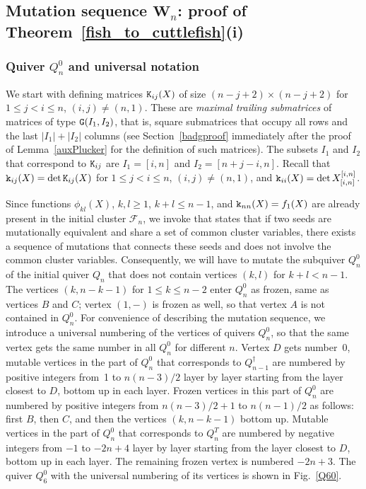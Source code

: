 \documentclass{amsart}
\theoremstyle{definition}
\theoremstyle{remark}
\numberwithin{equation}{section}
\numberwithin{theorem}{section}
\def\FF{{\mathcal F}}
\def\NG{{\tt G}}
\def\NK{{\tt K}}
\def\Ws{\mathbf W}
\def\ek{{\tt k}}
\begin{document}
\subsection{Mutation sequence $\Ws_n$: proof of Theorem~\ref{fish_to_cuttlefish}(i)} 
\subsubsection{Quiver $Q_n^0$ and universal notation} We start with defining matrices 
$\NK_{ij}(X)$ of size $(n-j+2)\times(n-j+2)$ for $1\le j<i\le n$, $(i,j)\ne(n,1)$. These are {\it maximal trailing submatrices\/} of matrices of type $\NG(I_1,I_2)$, that is, square submatrices that occupy all rows and the last 
$|I_1|+|I_2|$ columns (see Section~\ref{badgproof} immediately after the proof of Lemma~\ref{auxPlucker} for the definition of such matrices).  The subsets $I_1$ and $I_2$ that correspond to $\NK_{ij}$ are $I_1=[i,n]$ and $I_2=[n+j-i,n]$. Recall that $\ek_{ij}(X)=\det\NK_{ij}(X)$ for $1\le j<i\le n$, $(i,j)\ne(n,1)$, and $\ek_{ii}(X)=\det X_{[i,n]}^{[i,n]}$.

Since functions $\phi_{kl}(X)$, $k,l\ge1$, $k+l\le n-1$, and $\ek_{nn}(X)=f_1(X)$ are already present in the initial cluster $\FF_n$, we invoke \cite[Th.~3.6]{CL} that states that if two seeds are mutationally equivalent and share a set of common cluster variables, there exists a sequence of mutations that connects these
seeds and does not involve the common cluster variables. Consequently, we will have to mutate the subquiver $Q_n^0$ of the initial quiver $Q_n$ that does not contain vertices $(k,l)$ for $k+l<n-1$. The vertices $(k,n-k-1)$ for $1\le k\le n-2$ enter $Q_n^0$ as frozen, same as vertices $B$ and $C$; vertex $(1,-)$ is frozen as well, so that vertex $A$ is not contained in $Q_n^0$. For convenience of describing the mutation sequence, we introduce a universal numbering of the vertices of quivers $Q_n^0$, so that the same vertex gets the same number in all $Q_n^0$ for different $n$. Vertex $D$ gets number~0, mutable vertices in the part of $Q_n^0$ that corresponds to $Q_{n-1}^\dagger$ are numbered by positive integers from~1 to $n(n-3)/2$ layer by layer starting from the layer closest to $D$, bottom up in each layer. 
Frozen vertices in this part of $Q_n^0$ are numbered by positive integers from $n(n-3)/2+1$ to $n(n-1)/2$ as follows: first $B$, then $C$, and then the vertices $(k,n-k-1)$ bottom up. Mutable vertices in the part of $Q_n^0$ that corresponds to $Q_n^T$ are numbered by negative integers from $-1$ to $-2n+4$ 
layer by layer starting from the layer closest to $D$, bottom up in each layer. The remaining frozen vertex is numbered $-2n+3$. The quiver $Q_6^0$ with the universal numbering of its vertices is shown in Fig.~\ref{Q60}. 
\end{document}
